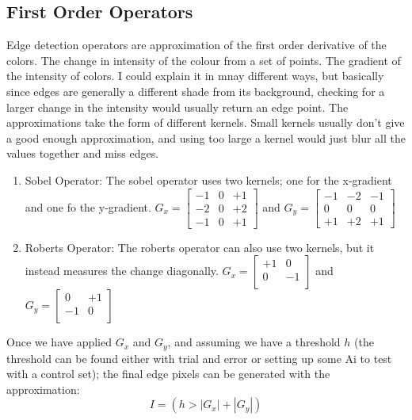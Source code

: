 \subsection{First Order Operators}
Edge detection operators are approximation of the first order derivative of the colors. The change in intensity of the colour from a set of points. The gradient of the intensity of colors. I could explain it in mnay different ways, but basically since edges are generally a different shade from its background, checking for a larger change in the intensity would usually return an edge point.
\newline
The approximations take the form of different kernels. Small kernels usually don't give a good enough approximation, and using too large a kernel would just blur all the values together and miss edges.
\begin{enumerate}
	\item Sobel Operator: The sobel operator uses two kernels; one for the x-gradient and one fo the y-gradient. $G_x =
	\begin{bmatrix}
		-1 & 0 & +1 \\
		-2 & 0 & +2 \\
		-1 & 0 & +1
	\end{bmatrix}$ and $G_y = 
		\begin{bmatrix}
	-1 & -2 & -1 \\
	0 & 0 & 0 \\
	+1 & +2 & +1
	\end{bmatrix}$
	\item Roberts Operator: The roberts operator can also use two kernels, but it instead measures the change diagonally. $G_x =
	\begin{bmatrix}
	+1 & 0 \\
	0 & -1 \\
	\end{bmatrix}$ and $G_y = 
	\begin{bmatrix}
	0 & +1 \\
	-1 & 0 \\
	\end{bmatrix}$
\end{enumerate}

Once we have applied $G_x$ and $G_y$, and assuming we have a threshold $h$ (the threshold can be found either with trial and error or setting up some Ai to test with a control set); the final edge pixels can be generated with the approximation:
\begin{equation}
I = (h > \left| G_x \right|  + \left| G_y \right| )
\end{equation}

